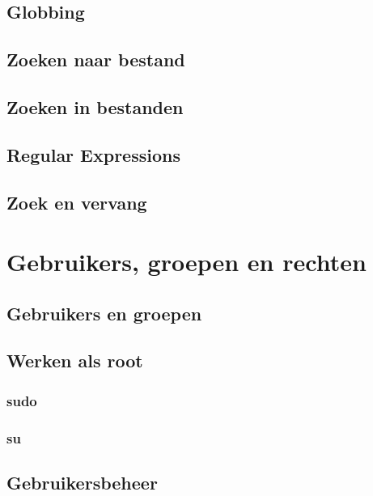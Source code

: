 \documentclass[a4paper,12pt,twoside,openright,titlepage]{book}
\begin{document}
\section{Globbing}

\section{Zoeken naar bestand}


\section{Zoeken in bestanden}


\section{Regular Expressions}

\section{Zoek en vervang}


\chapter{Gebruikers, groepen en rechten}

\section{Gebruikers en groepen}



\section{Werken als root}

\subsection{sudo}

\subsection{su}

\section{Gebruikersbeheer}






\end{document}

